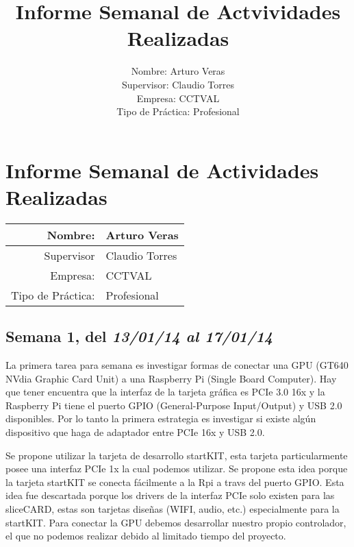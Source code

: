 \documentclass[11pt,oneside,titlepage]{article}
\begin{document}
\title{Informe Semanal de Actvividades Realizadas}
\author{Nombre: Arturo Veras\\ 
	Supervisor: Claudio Torres\\
	Empresa: CCTVAL \\
Tipo de Práctica: Profesional}
%
\section*{Informe Semanal de Actividades Realizadas}
\begin{center}

\begin{tabular}{|r|l|}
\hline 
Nombre:  & Arturo Veras\\ 
\hline 
Supervisor & Claudio Torres \\ 
\hline 
Empresa: & CCTVAL \\ 
\hline 
Tipo de Práctica: & Profesional \\ 
\hline 
\end{tabular} 
\end{center}
\subsection*{Semana 1, del \textit{13/01/14 al 17/01/14}}
\begin{comment}
Tercera persona Él, Ella, Ello (del latín ille, illa, illud)
Se redacta en lenguaje formal y atemporal (no usar formas verbales en pasado simple)
Compró el periódico y se tomó un café.
\end{comment}

La primera tarea para semana es investigar formas de conectar una GPU (GT640 NVdia Graphic Card Unit) a una Raspberry Pi (Single Board Computer). Hay que tener encuentra que la interfaz de la tarjeta gr\'afica es PCIe 3.0 16x y la Raspberry Pi tiene el puerto GPIO (General-Purpose Input/Output) y USB 2.0 disponibles. Por lo tanto la primera estrategia es investigar si existe alg\'un dispositivo que haga de adaptador entre PCIe 16x y USB 2.0. 


Se propone utilizar la tarjeta de desarrollo startKIT, esta tarjeta
particularmente posee una interfaz PCIe  1x la cual podemos utilizar.  Se
propone esta idea porque la tarjeta startKIT se conecta fácilmente a la Rpi a
travs del puerto GPIO.  Esta idea fue descartada porque los drivers de la
interfaz PCIe solo existen para las sliceCARD, estas son tarjetas diseñas
(WIFI, audio, etc.) especialmente para la startKIT. Para conectar la GPU
debemos desarrollar nuestro propio controlador, el que no podemos realizar
debido al limitado tiempo del proyecto.  
\end{document}

